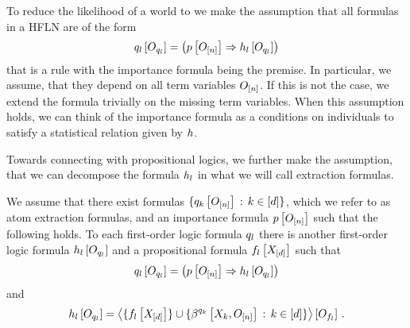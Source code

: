 

To reduce the likelihood of a world to we make the assumption that all formulas in a HFLN are of the form
\begin{align}
    \label{eq:folImplicationForm}
    q_{l}\left[O_{q_{l}}\right]
    = \left( p\left[O_{[n]}\right] \Rightarrow h_{l}\left[O_{q_{l}}\right] \right)
\end{align}
that is a rule with the importance formula being the premise.
In particular, we assume, that they depend on all term variables $O_{[n]}$.
If this is not the case, we extend the formula trivially on the missing term variables.
When this assumption holds, we can think of the importance formula as a conditions on individuals to satisfy a statistical relation given by $h$.

Towards connecting with propositional logics, we further make the assumption, that we can decompose the formula $h_{l}$ in what we will call extraction formulas.

\begin{assumption}
    \label{ass:propositionalHeads}
    We assume that there exist formulas $\{q_{k}\left[O_{[n]}\right] \, : \, k\in[d]\}$, which we refer to as atom extraction formulas, and an importance formula $p\left[O_{[n]}\right]$ such that the following holds.
    To each first-order logic formula $q_{l}$ there is another first-order logic formula $h_{l}\left[O_{q_{l}}\right]$ and a propositional formula $f_{l}\left[X_{[d]}\right]$ such that
    \begin{align*}
        q_{l}\left[O_{q_{l}}\right]
        = \left( p\left[O_{[n]}\right] \Rightarrow h_{l}\left[O_{q_{l}}\right] \right)
    \end{align*}
    and
    \begin{align*}
        h_{l}\left[O_{q_{l}}\right] =
        \left\langle 
            \{f_{l}\left[X_{[d]}\right]\} \cup \{\beta^{q_{k}}\left[X_{k},O_{[n]}\right] \, : \, k\in[d]\}
        \right\rangle \left[ O_{f_{l}} \right] \, .
    \end{align*}
\end{assumption}

